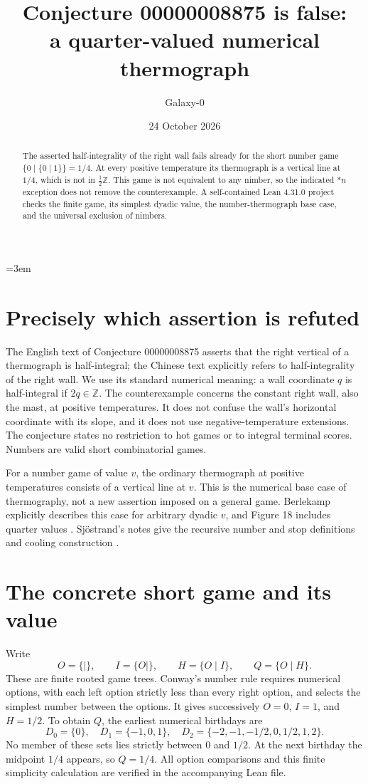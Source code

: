 \documentclass[10pt]{article}
\title{Conjecture 00000008875 is false:\\ a quarter-valued numerical thermograph}
\author{Galaxy-0}
\date{24 October 2026}
\begin{document}
\emergencystretch=3em
\maketitle
\begin{abstract}
The asserted half-integrality of the right wall fails already for the short
number game $\{0\mid\{0\mid1\}\}=1/4$. At every positive temperature its
thermograph is a vertical line at $1/4$, which is not in $\frac12\mathbb Z$.
This game is not equivalent to any nimber, so the indicated $*n$ exception
does not remove the counterexample. A self-contained Lean 4.31.0 project
checks the finite game, its simplest dyadic value, the number-thermograph
base case, and the universal exclusion of nimbers.
\end{abstract}

\section{Precisely which assertion is refuted}
The English text of Conjecture 00000008875 asserts that the right vertical
of a thermograph is half-integral; the Chinese text explicitly refers to
half-integrality of the right wall. We use its standard numerical meaning:
a wall coordinate $q$ is half-integral if $2q\in\mathbb Z$.
The counterexample concerns the constant right wall, also the mast, at
positive temperatures. It does not confuse the wall's horizontal coordinate
with its slope, and it does not use negative-temperature extensions.
The conjecture states no restriction to hot games or to integral terminal
scores. Numbers are valid short combinatorial games.

For a number game of value $v$, the ordinary thermograph at positive
temperatures consists of a vertical line at $v$. This is the numerical
base case of thermography, not a new assertion imposed on a general game.
Berlekamp explicitly describes this case for arbitrary dyadic $v$, and
Figure 18 includes quarter values \cite[Section~2.5, p.~388]{berlekamp}.
Sj\"ostrand's notes give the recursive number and stop definitions and
cooling construction \cite[Sections~6,8--9]{sjostrand}.

\section{The concrete short game and its value}
Write
\[
 O=\{\mid\},\qquad I=\{O\mid\},\qquad
 H=\{O\mid I\},\qquad Q=\{O\mid H\}.
\]
These are finite rooted game trees. Conway's number rule requires numerical
options, with each left option strictly less than every right option, and
selects the simplest number between the options. It gives successively
$O=0$, $I=1$, and $H=1/2$. To obtain $Q$, the earliest numerical birthdays are
\[
 D_0=\{0\},\quad D_1=\{-1,0,1\},\quad
 D_2=\{-2,-1,-1/2,0,1/2,1,2\}.
\]
No member of these sets lies strictly between $0$ and $1/2$.
At the next birthday the midpoint $1/4$ appears, so $Q=1/4$.
All option comparisons and this finite simplicity calculation are verified
in the accompanying Lean file.
\end{document}
